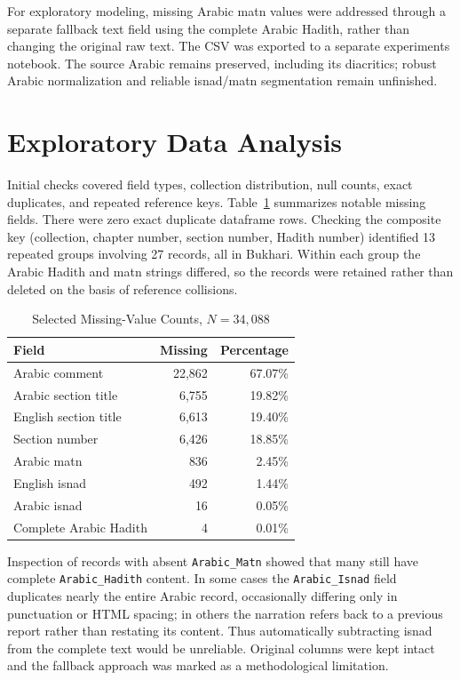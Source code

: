 \documentclass[conference]{IEEEtran}
\begin{document}
For exploratory modeling, missing Arabic matn values were addressed through a separate fallback text field using the complete Arabic Hadith, rather than changing the original raw text. The CSV was exported to a separate experiments notebook. The source Arabic remains preserved, including its diacritics; robust Arabic normalization and reliable isnad/matn segmentation remain unfinished.

\section{Exploratory Data Analysis}
Initial checks covered field types, collection distribution, null counts, exact duplicates, and repeated reference keys. Table~\ref{tab:missing} summarizes notable missing fields. There were zero exact duplicate dataframe rows. Checking the composite key (collection, chapter number, section number, Hadith number) identified 13 repeated groups involving 27 records, all in Bukhari. Within each group the Arabic Hadith and matn strings differed, so the records were retained rather than deleted on the basis of reference collisions.

\begin{table}[t]
\caption{Selected Missing-Value Counts, $N=34{,}088$}
\label{tab:missing}
\centering\footnotesize
\begin{tabular}{lrr}
\toprule
Field & Missing & Percentage\\
\midrule
Arabic comment & 22,862 & 67.07\%\\
Arabic section title & 6,755 & 19.82\%\\
English section title & 6,613 & 19.40\%\\
Section number & 6,426 & 18.85\%\\
Arabic matn & 836 & 2.45\%\\
English isnad & 492 & 1.44\%\\
Arabic isnad & 16 & 0.05\%\\
Complete Arabic Hadith & 4 & 0.01\%\\
\bottomrule
\end{tabular}
\end{table}

Inspection of records with absent \texttt{Arabic\_Matn} showed that many still have complete \texttt{Arabic\_Hadith} content. In some cases the \texttt{Arabic\_Isnad} field duplicates nearly the entire Arabic record, occasionally differing only in punctuation or HTML spacing; in others the narration refers back to a previous report rather than restating its content. Thus automatically subtracting isnad from the complete text would be unreliable. Original columns were kept intact and the fallback approach was marked as a methodological limitation.
\end{document}
